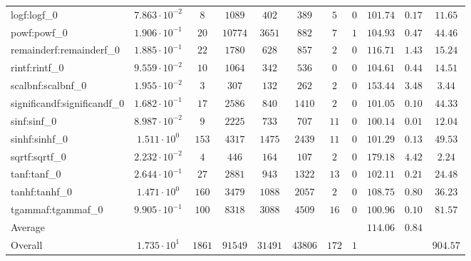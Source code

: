 \begin{tabular}{|l|c|c|c|c|c|c|c|c|c|c|}
logf:logf\_0                 & $ 7.863 \cdot 10^{-2} $ & $ 8      $ & $ 1089  $ & $ 402   $ & $ 389   $ & $ 5   $ & $ 0 $ & $ 101.74      $ & $ 0.17    $ & $ 11.65   $ \\
powf:powf\_0                 & $ 1.906 \cdot 10^{-1} $ & $ 20     $ & $ 10774 $ & $ 3651  $ & $ 882   $ & $ 7   $ & $ 1 $ & $ 104.93      $ & $ 0.47    $ & $ 44.46   $ \\
remainderf:remainderf\_0     & $ 1.885 \cdot 10^{-1} $ & $ 22     $ & $ 1780  $ & $ 628   $ & $ 857   $ & $ 2   $ & $ 0 $ & $ 116.71      $ & $ 1.43    $ & $ 15.24   $ \\
rintf:rintf\_0               & $ 9.559 \cdot 10^{-2} $ & $ 10     $ & $ 1064  $ & $ 342   $ & $ 536   $ & $ 0   $ & $ 0 $ & $ 104.61      $ & $ 0.44    $ & $ 14.51   $ \\
scalbnf:scalbnf\_0           & $ 1.955 \cdot 10^{-2} $ & $ 3      $ & $ 307   $ & $ 132   $ & $ 262   $ & $ 2   $ & $ 0 $ & $ 153.44      $ & $ 3.48    $ & $ 3.44    $ \\
significandf:significandf\_0 & $ 1.682 \cdot 10^{-1} $ & $ 17     $ & $ 2586  $ & $ 840   $ & $ 1410  $ & $ 2   $ & $ 0 $ & $ 101.05      $ & $ 0.10    $ & $ 44.33   $ \\
sinf:sinf\_0                 & $ 8.987 \cdot 10^{-2} $ & $ 9      $ & $ 2225  $ & $ 733   $ & $ 707   $ & $ 11  $ & $ 0 $ & $ 100.14      $ & $ 0.01    $ & $ 12.04   $ \\
sinhf:sinhf\_0               & $ 1.511 \cdot 10^{0}  $ & $ 153    $ & $ 4317  $ & $ 1475  $ & $ 2439  $ & $ 11  $ & $ 0 $ & $ 101.29      $ & $ 0.13    $ & $ 49.53   $ \\
sqrtf:sqrtf\_0               & $ 2.232 \cdot 10^{-2} $ & $ 4      $ & $ 446   $ & $ 164   $ & $ 107   $ & $ 2   $ & $ 0 $ & $ 179.18      $ & $ 4.42    $ & $ 2.24    $ \\
tanf:tanf\_0                 & $ 2.644 \cdot 10^{-1} $ & $ 27     $ & $ 2881  $ & $ 943   $ & $ 1322  $ & $ 13  $ & $ 0 $ & $ 102.11      $ & $ 0.21    $ & $ 24.48   $ \\
tanhf:tanhf\_0               & $ 1.471 \cdot 10^{0}  $ & $ 160    $ & $ 3479  $ & $ 1088  $ & $ 2057  $ & $ 2   $ & $ 0 $ & $ 108.75      $ & $ 0.80    $ & $ 36.23   $ \\
tgammaf:tgammaf\_0           & $ 9.905 \cdot 10^{-1} $ & $ 100    $ & $ 8318  $ & $ 3088  $ & $ 4509  $ & $ 16  $ & $ 0 $ & $ 100.96      $ & $ 0.10    $ & $ 81.57   $ \\
\hline
Average                      & $                     $ & $        $ & $       $ & $       $ & $       $ & $     $ & $   $ & $ 114.06      $ & $ 0.84    $ & $         $ \\
\hline
Overall                      & $ 1.735 \cdot 10^{1}  $ & $ 1861   $ & $ 91549 $ & $ 31491 $ & $ 43806 $ & $ 172 $ & $ 1 $ & $             $ & $         $ & $ 904.57  $ \\
\hline
\end{tabular}
